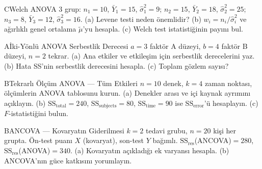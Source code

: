 \begin{alistirma}[Al.16.9]{C}{Welch ANOVA}
3 grup: $n_1=10$, $\bar Y_1=15$, $\hat\sigma_1^2=9$; $n_2=15$, $\bar Y_2=18$, $\hat\sigma_2^2=25$; $n_3=8$, $\bar Y_3=12$, $\hat\sigma_3^2=16$. (a) Levene testi neden önemlidir? (b) $w_i=n_i/\hat\sigma_i^2$ ve ağırlıklı genel ortalama $\tilde\mu$'yu hesapla. (c) Welch test istatistiğinin payını bul.
\end{alistirma}

\begin{alistirma}[Al.16.10]{A}{İki-Yönlü ANOVA Serbestlik Derecesi}
$a=3$ faktör A düzeyi, $b=4$ faktör B düzeyi, $n=2$ tekrar. (a) Ana etkiler ve etkileşim için serbestlik derecelerini yaz. (b) Hata SS'nin serbestlik derecesini hesapla. (c) Toplam gözlem sayısı?
\end{alistirma}

\begin{alistirma}[Al.16.11]{B}{Tekrarlı Ölçüm ANOVA --- Tüm Etkileri}
$n=10$ denek, $k=4$ zaman noktası, ölçümlerin ANOVA tablosunu kurun. (a) Denekler arası ve içi kaynak ayrımını açıklayın. (b) $\mathrm{SS}_\mathrm{total}=240$, $\mathrm{SS}_\mathrm{subjects}=80$, $\mathrm{SS}_\mathrm{time}=90$ ise $\mathrm{SS}_\mathrm{error}$'ü hesaplayın. (c) $F$-istatistiğini bulun.
\end{alistirma}

\begin{alistirma}[Al.16.12]{B}{ANCOVA --- Kovaryatın Giderilmesi}
$k=2$ tedavi grubu, $n=20$ kişi her grupta. Ön-test puanı $X$ (kovaryat), son-test $Y$ bağımlı. $\mathrm{SS}_\mathrm{res}$(ANCOVA)$=280$, $\mathrm{SS}_\mathrm{res}$(ANOVA)$=340$. (a) Kovaryatın açıkladığı ek varyansı hesapla. (b) ANCOVA'nın güce katkısını yorumlayın.
\end{alistirma}

